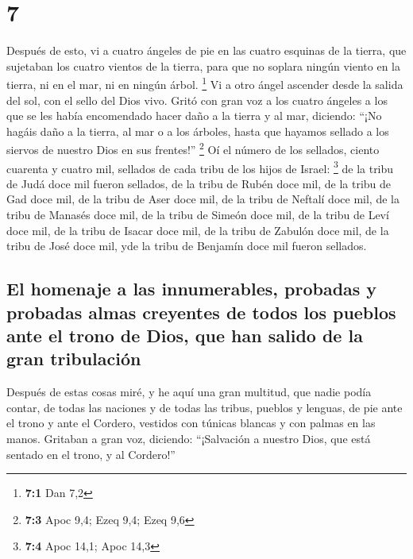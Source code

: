 \hypertarget{section-6}{%
\section{7}\label{section-6}}

 Después de esto, vi a cuatro ángeles de pie en las cuatro
esquinas de la tierra, que sujetaban los cuatro vientos de la tierra,
para que no soplara ningún viento en la tierra, ni en el mar, ni en
ningún árbol. \footnote{\textbf{7:1} Dan 7,2}  Vi a otro
ángel ascender desde la salida del sol, con el sello del Dios vivo.
Gritó con gran voz a los cuatro ángeles a los que se les había
encomendado hacer daño a la tierra y al mar,  diciendo:
``¡No hagáis daño a la tierra, al mar o a los árboles, hasta que hayamos
sellado a los siervos de nuestro Dios en sus frentes!'' \footnote{\textbf{7:3}
  Apoc 9,4; Ezeq 9,4; Ezeq 9,6}  Oí el número de los
sellados, ciento cuarenta y cuatro mil, sellados de cada tribu de los
hijos de Israel: \footnote{\textbf{7:4} Apoc 14,1; Apoc 14,3}
 de la tribu de Judá doce mil fueron sellados, de la tribu
de Rubén doce mil, de la tribu de Gad doce mil,  de la
tribu de Aser doce mil, de la tribu de Neftalí doce mil, de la tribu de
Manasés doce mil,  de la tribu de Simeón doce mil, de la
tribu de Leví doce mil, de la tribu de Isacar doce mil, 
de la tribu de Zabulón doce mil, de la tribu de José doce mil, yde la
tribu de Benjamín doce mil fueron sellados.

\hypertarget{el-homenaje-a-las-innumerables-probadas-y-probadas-almas-creyentes-de-todos-los-pueblos-ante-el-trono-de-dios-que-han-salido-de-la-gran-tribulaciuxf3n}{%
\subsection{El homenaje a las innumerables, probadas y probadas almas
creyentes de todos los pueblos ante el trono de Dios, que han salido de
la gran
tribulación}\label{el-homenaje-a-las-innumerables-probadas-y-probadas-almas-creyentes-de-todos-los-pueblos-ante-el-trono-de-dios-que-han-salido-de-la-gran-tribulaciuxf3n}}

 Después de estas cosas miré, y he aquí una gran multitud,
que nadie podía contar, de todas las naciones y de todas las tribus,
pueblos y lenguas, de pie ante el trono y ante el Cordero, vestidos con
túnicas blancas y con palmas en las manos.  Gritaban a
gran voz, diciendo: ``¡Salvación a nuestro Dios, que está sentado en el
trono, y al Cordero!''

